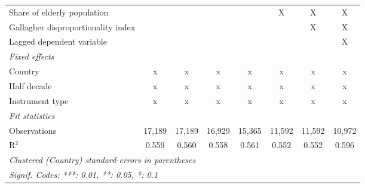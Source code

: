 \begin{tabular}{lccccccc}
   Share of elderly population                                       &               &               &              &              & X            & X            & X\\  
   Gallagher disproportionality index                                &               &               &              &              &              & X            & X\\  
   Lagged dependent variable                                         &               &               &              &              &              &              & X\\  
   \emph{Fixed effects}\\
   Country                                                           & x             & x             & x            & x            & x            & x            & x\\  
   Half decade                                                       & x             & x             & x            & x            & x            & x            & x\\  
   Instrument type                                                   & x             & x             & x            & x            & x            & x            & x\\  
   \midrule \emph{Fit statistics}\\
   Observations                                                      & 17,189        & 17,189        & 16,929       & 15,365       & 11,592       & 11,592       & 10,972\\  
   R$^2$                                                             & 0.559         & 0.560         & 0.558        & 0.561        & 0.552        & 0.552        & 0.596\\  
   \midrule
   \multicolumn{8}{l}{\emph{Clustered (Country) standard-errors in parentheses}}\\
   \multicolumn{8}{l}{\emph{Signif. Codes: ***: 0.01, **: 0.05, *: 0.1}}\\
\end{tabular}
\par\endgroup


